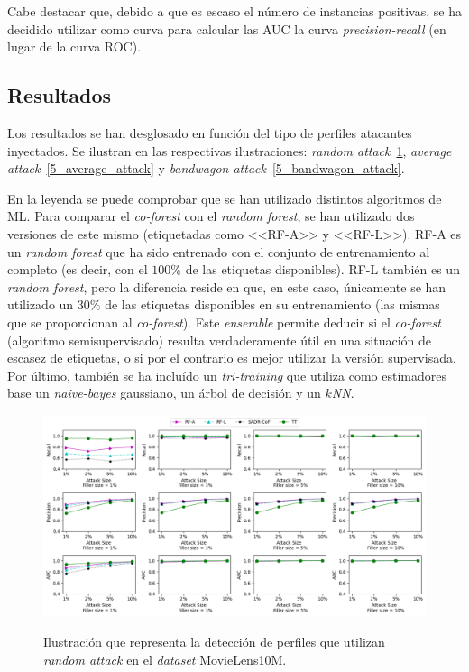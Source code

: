 Cabe destacar que, debido a que es escaso el número de instancias positivas, se ha decidido utilizar como curva para calcular las AUC la curva \textit{precision-recall} (en lugar de la curva ROC).

\subsection{Resultados}

Los resultados se han desglosado en función del tipo de perfiles atacantes inyectados. Se ilustran en las respectivas ilustraciones: \textit{random attack}~\ref{5_random_attack}, \textit{average attack}~\ref{5_average_attack} y \textit{bandwagon attack}~\ref{5_bandwagon_attack}.

En la leyenda se puede comprobar que se han utilizado distintos algoritmos de ML. Para comparar el \textit{co-forest} con el \textit{random forest}, se han utilizado dos versiones de este mismo (etiquetadas como <<RF-A>> y <<RF-L>>). RF-A es un \textit{random forest} que ha sido entrenado con el conjunto de entrenamiento al completo (es decir, con el $100\%$ de las etiquetas disponibles). RF-L también es un \textit{random forest}, pero la diferencia reside en que, en este caso, únicamente se han utilizado un $30\%$ de las etiquetas disponibles en su entrenamiento (las mismas que se proporcionan al \textit{co-forest}). Este \textit{ensemble} permite deducir si el \textit{co-forest} (algoritmo semisupervisado) resulta verdaderamente útil en una situación de escasez de etiquetas, o si por el contrario es mejor utilizar la versión supervisada. Por último, también se ha incluído un \textit{tri-training} que utiliza como estimadores base un \textit{naive-bayes} gaussiano, un árbol de decisión y un \textit{$k$NN}.

\begin{figure}[h]
	\caption[\textit{Random attack}: detección.]{Ilustración que representa la detección de perfiles que utilizan \textit{random attack} en el \textit{dataset} MovieLens10M.}
	\centering
	\includegraphics[scale=0.44]{../img/memoria/5_resultados_random_attack}
	\label{5_random_attack}
\end{figure}

